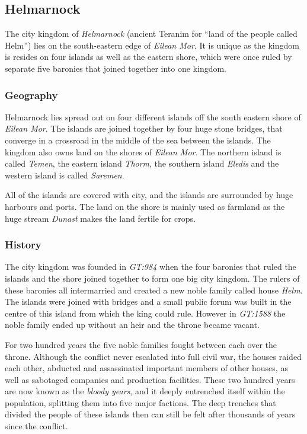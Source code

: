 \subsection{Helmarnock}
\label{sec:Helmarnock}

The city kingdom of \emph{Helmarnock} (ancient Teranim for ``land of the
people called Helm'') lies on the south-eastern edge of \emph{Eilean Mor}. It
is unique as the kingdom is resides on four islands as well as the eastern
shore, which were once ruled by separate five baronies that joined together
into one kingdom.

\subsubsection*{Geography}

Helmarnock lies spread out on four different islands off the south eastern
shore of \emph{Eilean Mor}. The islands are joined together by four huge
stone bridges, that converge in a crossroad in the middle of the sea between
the islands. The kingdom also owns land on the shores of \emph{Eilean Mor}.
The northern island is called \emph{Temen}, the eastern island \emph{Thorm},
the southern island \emph{Eledis} and the western island is called
\emph{Saremen}.

All of the islands are covered with city, and the islands are surrounded by
huge harbours and ports. The land on the shore is mainly used as farmland as
the huge stream \emph{Dunast} makes the land fertile for crops.

\subsubsection*{History}

The city kingdom was founded in \emph{GT:984} when the four baronies that
ruled the islands and the shore joined together to form one big city kingdom.
The rulers of these baronies all intermarried and created a new noble family
called house \emph{Helm}. The islands were joined with bridges and a small
public forum was built in the centre of this island from which the king could
rule. However in \emph{GT:1588} the noble family ended up without an heir and
the throne became vacant.

For two hundred years the five noble families fought between each over the
throne. Although the conflict never escalated into full civil war, the houses
raided each other, abducted and assassinated important members of other
houses, as well as sabotaged companies and production facilities. These two
hundred years are now known as the \emph{bloody years}, and it deeply
entrenched itself within the population, splitting them into five major
factions. The deep trenches that divided the people of these islands then can
still be felt after thousands of years since the conflict.

